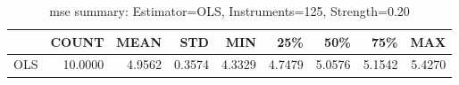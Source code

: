\begin{table}[ht]
\centering
\caption{mse summary: Estimator=OLS, Instruments=125, Strength=0.20}
\begin{tabular}{lrrrrrrrr}
\toprule
 & COUNT & MEAN & STD & MIN & 25\% & 50\% & 75\% & MAX \\
\midrule
OLS & 10.0000 & 4.9562 & 0.3574 & 4.3329 & 4.7479 & 5.0576 & 5.1542 & 5.4270 \\
\bottomrule
\end{tabular}
\end{table}
